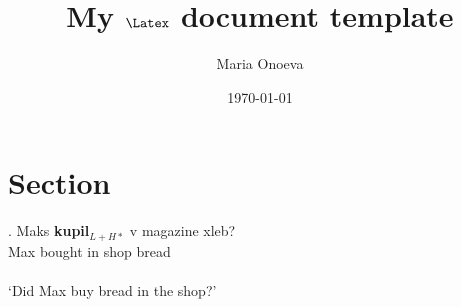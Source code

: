 

    
\title{My $\Latex$ document template}
\date{\today}
\author{Maria Onoeva}

\maketitle

\section{Section}\label{sec:section}
\cite{Abels2005}

\exg.
Maks \textcolor{WildStrawberry}{\textbf{kupil}}$_{L+H*}$ v magazine xleb? \\
Max bought in shop bread \\\\
`Did Max buy bread in the shop?' 
\label{ex:inton1}
\par







